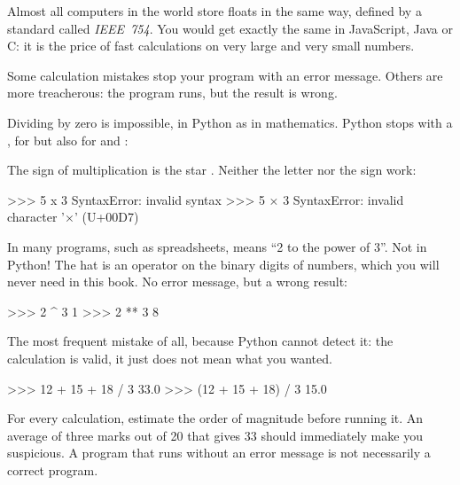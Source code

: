 \begin{culture}
Almost all computers in the world store floats in the same way, defined by a standard called
\emph{IEEE~754}. You would get exactly the same  in JavaScript, Java or C:
it is the price of fast calculations on very large and very small numbers.
\end{culture}


Some calculation mistakes stop your program with an error message. Others are more treacherous: the
program runs, but the result is wrong.

Dividing by zero is impossible, in Python as in mathematics. Python stops with a
, for \py{/} but also for \py{//} and \py{\%}:

The sign of multiplication is the star \py{*}. Neither the letter  nor the sign  work:
\begin{console}
>>> 5 x 3
SyntaxError: invalid syntax
>>> 5 × 3
SyntaxError: invalid character '×' (U+00D7)
\end{console}

In many programs, such as spreadsheets,  means \enquote{2 to the power of 3}. Not in
Python! The hat \py{\textasciicircum{}} is an operator on the binary digits of numbers, which you will never need
in this book. No error message, but a wrong result:
\begin{console}
>>> 2 ^ 3
1
>>> 2 ** 3
8
\end{console}

The most frequent mistake of all, because Python cannot detect it: the calculation is valid, it just
does not mean what you wanted.
\begin{console}
>>> 12 + 15 + 18 / 3
33.0
>>> (12 + 15 + 18) / 3
15.0
\end{console}

\begin{pratique}
For every calculation, estimate the order of magnitude before running it. An average of three marks
out of 20 that gives 33 should immediately make you suspicious. A program that runs without an error
message is not necessarily a correct program.
\end{pratique}

